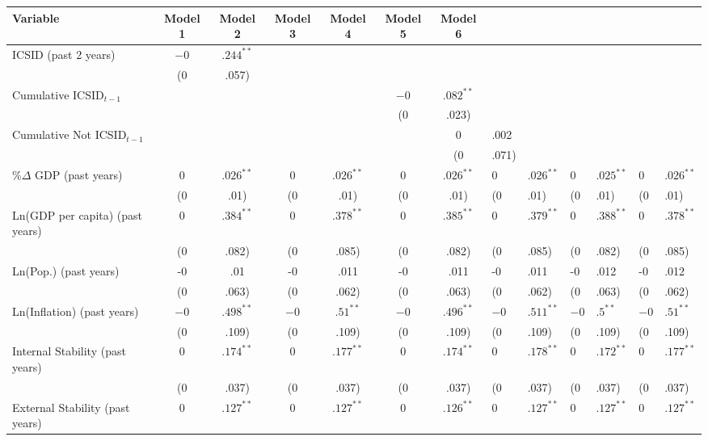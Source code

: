 \begin{table}[ht]
\centering
\begingroup\footnotesize
\begin{tabular}{lcccccc}
 Variable & Model 1 & Model 2 & Model 3 & Model 4 & Model 5 & Model 6 \\ 
  \hline
\hline
ICSID (past 2 years) & $-0$&$.244^{\ast\ast}$ &  &  &  &  &  \\ 
   & (0&.057) &  &  &  &  &  \\ 
  Cumulative ICSID$_{t-1}$ &  &  &  &  & $-0$&$.082^{\ast\ast}$ &  \\ 
   &  &  &  &  & (0&.023) &  \\ 
  Cumulative Not ICSID$_{t-1}$ &  &  &  &  &  & 0&.002 \\ 
   &  &  &  &  &  & (0&.071) \\ 
  \%$\Delta$ GDP (past  years) & $0$&$.026^{\ast\ast}$ & $0$&$.026^{\ast\ast}$ & $0$&$.026^{\ast\ast}$ & $0$&$.026^{\ast\ast}$ & $0$&$.025^{\ast\ast}$ & $0$&$.026^{\ast\ast}$ \\ 
   & (0&.01) & (0&.01) & (0&.01) & (0&.01) & (0&.01) & (0&.01) \\ 
  Ln(GDP per capita) (past  years) & $0$&$.384^{\ast\ast}$ & $0$&$.378^{\ast\ast}$ & $0$&$.385^{\ast\ast}$ & $0$&$.379^{\ast\ast}$ & $0$&$.388^{\ast\ast}$ & $0$&$.378^{\ast\ast}$ \\ 
   & (0&.082) & (0&.085) & (0&.082) & (0&.085) & (0&.082) & (0&.085) \\ 
  Ln(Pop.) (past  years) & -0&.01 & -0&.011 & -0&.011 & -0&.011 & -0&.012 & -0&.012 \\ 
   & (0&.063) & (0&.062) & (0&.063) & (0&.062) & (0&.063) & (0&.062) \\ 
  Ln(Inflation) (past  years) & $-0$&$.498^{\ast\ast}$ & $-0$&$.51^{\ast\ast}$ & $-0$&$.496^{\ast\ast}$ & $-0$&$.511^{\ast\ast}$ & $-0$&$.5^{\ast\ast}$ & $-0$&$.51^{\ast\ast}$ \\ 
   & (0&.109) & (0&.109) & (0&.109) & (0&.109) & (0&.109) & (0&.109) \\ 
  Internal Stability (past  years) & $0$&$.174^{\ast\ast}$ & $0$&$.177^{\ast\ast}$ & $0$&$.174^{\ast\ast}$ & $0$&$.178^{\ast\ast}$ & $0$&$.172^{\ast\ast}$ & $0$&$.177^{\ast\ast}$ \\ 
   & (0&.037) & (0&.037) & (0&.037) & (0&.037) & (0&.037) & (0&.037) \\ 
  External Stability (past  years) & $0$&$.127^{\ast\ast}$ & $0$&$.127^{\ast\ast}$ & $0$&$.126^{\ast\ast}$ & $0$&$.127^{\ast\ast}$ & $0$&$.127^{\ast\ast}$ & $0$&$.127^{\ast\ast}$ \\ 

\end{tabular}
\end{table}
